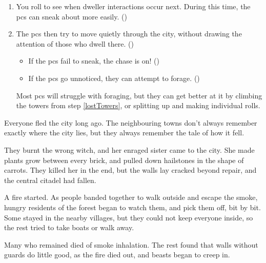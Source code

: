 \begin{multicols}{2}
\begin{enumerate}
  \item
  You roll to see when dweller interactions occur next.
  During this time, the \glspl{pc} can sneak about more easily.
  ()
  \item
  The \glspl{pc} then try to move quietly through the city, without drawing the attention of those who dwell there.
  ()
  \begin{itemize}
    \item
    If the \glspl{pc} fail to sneak, the chase is on!
    ()
    \item
    If the \glspl{pc} go unnoticed, they can attempt to forage.
    ()
  \end{itemize}
  Most \glspl{pc} will struggle with foraging, but they can get better at it by climbing the towers from step \ref{lostTowers}, or splitting up and making individual rolls.
\end{enumerate}

\label{lostCataclysm}

Everyone fled the city long ago.
The neighbouring towns don't always remember exactly where the city lies, but they always remember the tale of how it fell.

\begin{dlist}
  \item
  They burnt the wrong witch, and her enraged sister came to the city.
  She made plants grow between every brick, and pulled down hailstones in the shape of carrots.
  They killed her in the end, but the walls lay cracked beyond repair, and the central citadel had fallen.
  \item
  A fire started.
  As people banded together to walk outside and escape the smoke, hungry residents of the forest began to watch them, and pick them off, bit by bit.
  Some stayed in the nearby \glspl{village}, but they could not keep everyone inside, so the rest tried to take boats or walk away.

  Many who remained died of smoke inhalation.
  The rest found that walls without guards do little good, as the fire died out, and beasts began to creep in.


\end{dlist}
\end{multicols}
